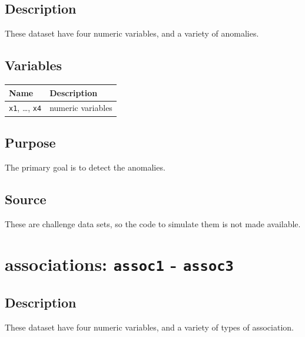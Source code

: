 \documentclass[
  letterpaper,
]{krantz}
\begin{document}
\subsection*{Description}\label{description-10}

These dataset have four numeric variables, and a variety of anomalies.

\subsection*{Variables}\label{variables-10}

\begin{longtable}[]{@{}ll@{}}
\toprule\noalign{}
Name & Description \\
\midrule\noalign{}
\endhead
\bottomrule\noalign{}
\endlastfoot
\texttt{x1}, \ldots, \texttt{x4} & numeric variables \\
\end{longtable}

\subsection*{Purpose}\label{purpose-10}

The primary goal is to detect the anomalies.

\subsection*{Source}\label{source-10}

These are challenge data sets, so the code to simulate them is not made
available.

\section{\texorpdfstring{associations: \texttt{assoc1} -
\texttt{assoc3}}{associations: assoc1 - assoc3}}\label{associations-assoc1---assoc3}

\subsection*{Description}\label{description-11}

These dataset have four numeric variables, and a variety of types of
association.
\end{document}
